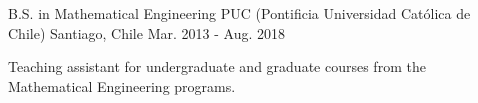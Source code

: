 

\begin{cventries}

  \cventry
    {B.S. in Mathematical Engineering} %
    {PUC (Pontificia Universidad Católica de Chile)} %
    {Santiago, Chile} %
    {Mar. 2013 - Aug. 2018} %
    {
      \begin{cvitems} %
        \item {Teaching assistant for undergraduate and graduate courses from the Mathematical Engineering programs.}
      \end{cvitems}
    }

\end{cventries}
